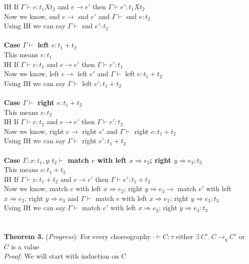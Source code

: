\documentclass{article}
\begin{document}
IH If $\Gamma \vdash e : t_1Xt_2$ and  $e \to e'$ then $\Gamma \vdash e' : t_1Xt_2$ \\
Now we know, snd $e \to$ snd $e'$ and $\Gamma \vdash$ snd $e : t_2$ \\
Using IH we can say $\Gamma \vdash$ snd $ e' : t_2$ \\\\
\textbf{Case $\Gamma \vdash$ left $e : t_1+t_2$ } \\
This means $e : t_1$ \\
IH If $\Gamma \vdash e : t_1$ and  $e \to e'$ then $\Gamma \vdash e' : t_1$ \\
Now we know, left $e \to$ left $e'$ and $\Gamma \vdash$ left $e : t_1+t_2$ \\
Using IH we can say $\Gamma \vdash$ left $ e' : t_1+t_2$ \\\\
\textbf{Case $\Gamma \vdash$ right $e : t_1+t_2$ } \\
This means $e : t_2$ \\
IH If $\Gamma \vdash e : t_2$ and  $e \to e'$ then $\Gamma \vdash e' : t_2$ \\
Now we know, right $e \to$ right $e'$ and $\Gamma \vdash$ right $e : t_1+t_2$ \\
Using IH we can say $\Gamma \vdash$ right $ e' : t_1+t_2$ \\
\\
\textbf{Case $\Gamma; x: t_1, y: t_2 \vdash$ match $e$ with left $x \Rightarrow e_2 $; right $ y \Rightarrow e_3 : t_3$ } \\
This means $e : t_1 + t_2$ \\
IH If $\Gamma \vdash e : t_1+t_2$ and  $e \to e'$ then $\Gamma \vdash e' : t_1+t_2$ \\
Now we know, match $e$ with left $x \Rightarrow e_2 $; right $ y \Rightarrow e_3 \to$
match $e'$ with left $x \Rightarrow e_2 $; right $ y \Rightarrow e_3$ and $\Gamma \vdash$ match $e$ with left $x \Rightarrow e_2 $; right $ y \Rightarrow e_3 : t_3$ \\
Using IH we can say $\Gamma \vdash$ match $e'$ with left $x \Rightarrow e_2 $; right $ y \Rightarrow e_3 : t_3$ 
\\\\
\\
\textbf{Theorem 3.} (\textit{Progress}): For every choreography $\cdot \vdash C : \tau$ either $  \exists \ C'.\ C \to_g C'$  or $C$ is a value
  \\
\textit{Proof.} We will start with induction on C \\\\
\end{document}
